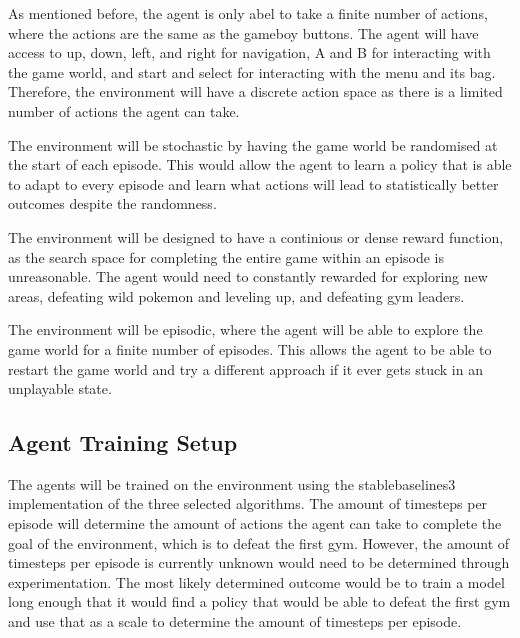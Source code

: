 As mentioned before, the agent is only abel to take a finite number of actions, where the actions are the same as the gameboy buttons. The agent will have access to up, down, left, and right for navigation, A and B for interacting with the game world, and start and select for interacting with the menu and its bag. Therefore, the environment will have a discrete action space as there is a limited number of actions the agent can take. 

The environment will be stochastic by having the game world be randomised at the start of each episode. This would allow the agent to learn a policy that is able to adapt to every episode and learn what actions will lead to statistically better outcomes despite the randomness.

The environment will be designed to have a continious or dense reward function, as the search space for completing the entire game within an episode is unreasonable. The agent would need to constantly rewarded for exploring new areas, defeating wild pokemon and leveling up, and defeating gym leaders. 

The environment will be episodic, where the agent will be able to explore the game world for a finite number of episodes. This allows the agent to be able to restart the game world and try a different approach if it ever gets stuck in an unplayable state.

\subsection{Agent Training Setup}

The agents will be trained on the environment using the stablebaselines3 implementation of the three selected algorithms. The amount of timesteps per episode will determine the amount of actions the agent can take to complete the goal of the environment, which is to defeat the first gym. However, the amount of timesteps per episode is currently unknown would need to be determined through experimentation. The most likely determined outcome would be to train a model long enough that it would find a policy that would be able to defeat the first gym and use that as a scale to determine the amount of timesteps per episode. 